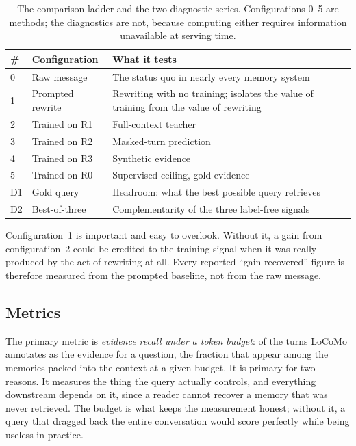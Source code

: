 \documentclass[12pt,letterpaper,oneside]{report}
\newcommand{\Rz}{R0}
\newcommand{\Ra}{R1}
\newcommand{\Rb}{R2}
\newcommand{\Rc}{R3}
\newenvironment{tab}{\begingroup\singlespacing\small}{\endgroup}
\begin{document}
\begin{table}[htbp]
\caption[The comparison ladder and diagnostic series]{The comparison ladder and the two diagnostic series. Configurations
0--5 are methods; the diagnostics are not, because computing either requires
information unavailable at serving time.}
\label{tab:ladder}
\centering
\begin{tab}
\begin{tabular}{@{}C{0.42in}L{1.35in}L{3.0in}@{}}
\toprule
\textbf{\#} & \textbf{Configuration} & \textbf{What it tests} \\
 & Raw message & The status quo in nearly every memory system \\
1 & Prompted rewrite & Rewriting with no training; isolates the
value of training from the value of rewriting \\
2 & Trained on \Ra & Full-context teacher \\
3 & Trained on \Rb & Masked-turn prediction \\
4 & Trained on \Rc & Synthetic evidence \\
5 & Trained on \Rz & Supervised ceiling, gold evidence \\
\midrule
D1 & Gold query & Headroom: what the best possible query retrieves \\
D2 & Best-of-three & Complementarity of the three label-free
signals \\
\bottomrule
\end{tabular}
\end{tab}
\end{table}

Configuration~1 is important and easy to overlook. Without it, a gain from
configuration~2 could be credited to the training signal when it was really
produced by the act of rewriting at all. Every reported ``gain recovered''
figure is therefore measured from the prompted baseline, not from the raw
message.

\subsection{Metrics}
\label{sec:metrics}

The primary metric is \emph{evidence recall under a token budget}: of the turns
LoCoMo annotates as the evidence for a question, the fraction that appear among
the memories packed into the context at a given budget. It is primary for two
reasons. It measures the thing the query actually controls, and everything
downstream depends on it, since a reader cannot recover a memory that was never
retrieved. The budget is what keeps the measurement honest; without it, a query
that dragged back the entire conversation would score perfectly while being
useless in practice.
\end{document}
